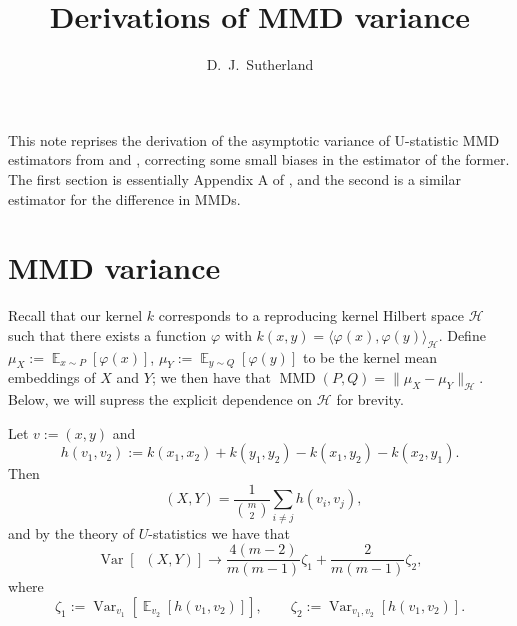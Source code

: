 \documentclass{article}
\title{Derivations of MMD variance}
\author{D.\ J.\ Sutherland}
\date{}
\DeclareMathOperator{\E}{\mathbb{E}}
\DeclareMathOperator{\Var}{Var}
\DeclareMathOperator{\mmd}{MMD}
\DeclareMathOperator{\mmdsqu}{\widehat{MMD}_U^2}
\begin{document}
\maketitle
\allowdisplaybreaks

This note reprises the derivation of the asymptotic variance of U-statistic MMD estimators from \textcite{three-sample} and \textcite{opt-mmd}, correcting some small biases in the estimator of the former. The first section is essentially Appendix A of \textcite{opt-mmd}, and the second is a similar estimator for the difference in MMDs.

\section{MMD variance}

Recall that our kernel $k$ corresponds to a reproducing kernel Hilbert space $\mathcal H$
such that there exists a function $\varphi$ with $k(x, y) = \langle \varphi(x), \varphi(y) \rangle_{\mathcal H}$.
Define $\mu_X := \E_{x \sim P}[ \varphi(x) ]$,
$\mu_Y := \E_{y \sim Q}[ \varphi(y) ]$ to be the kernel mean embeddings of $X$ and $Y$;
we then have that $\mmd(P, Q) = \lVert \mu_X - \mu_Y \rVert_{\mathcal H}$.
Below, we will supress the explicit dependence on $\mathcal H$ for brevity.

Let \(v := (x, y)\) and \[
h(v_1, v_2) := k(x_1, x_2) + k(y_1, y_2) - k(x_1, y_2) - k(x_2, y_1)
.\]
Then \[
\mmdsqu(X, Y) = \frac{1}{\binom{m}{2}} \sum_{i \ne j} h(v_i, v_j)
,\]
and by the theory of \(U\)-statistics \parencite[Chapter~5]{serfling} we have that \[
\Var\left[ \mmdsqu(X, Y) \right] \to \frac{4 (m-2)}{m (m-1)} \zeta_1 + \frac{2}{m (m-1)} \zeta_2
,\] where \[
\zeta_1 := \Var_{v_1}\left[ \E_{v_2}\left[ h(v_1, v_2) \right] \right],
\qquad
\zeta_2 := \Var_{v_1, v_2}\left[ h(v_1, v_2) \right]
.\]
\end{document}

